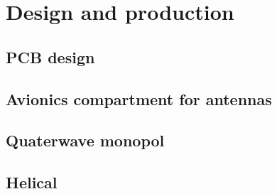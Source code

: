\chapter{Design and production}
\section{PCB design}
\section{Avionics compartment for antennas}
\section{Quaterwave monopol}
\section{Helical}
